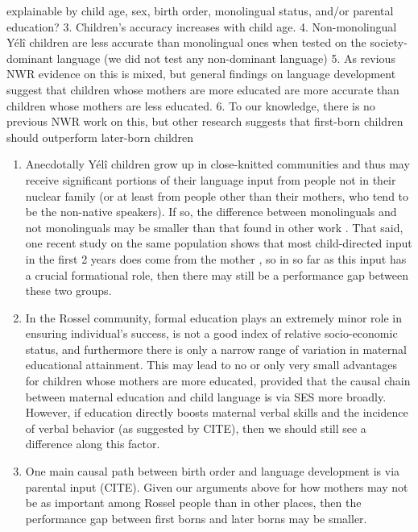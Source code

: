 \documentclass[english,,man,floatsintext]{apa6}
\providecommand{\tightlist}{%
  \setlength{\itemsep}{0pt}\setlength{\parskip}{0pt}}
\begin{document}
explainable by child age, sex, birth order, monolingual status, and/or parental education?
3. Children's accuracy increases with child age.
4. Non-monolingual Yélî children are less accurate than monolingual ones when tested on the society-dominant language (we did not test any non-dominant language)
5. As revious NWR evidence on this is mixed, but general findings on language development suggest that children whose mothers are more educated are more accurate than children whose mothers are less educated.
6. To our knowledge, there is no previous NWR work on this, but other research suggests that first-born children should outperform later-born children

\begin{enumerate}
\def\labelenumi{\arabic{enumi}.}
\setcounter{enumi}{3}
\tightlist
\item
  Anecdotally Yélî children grow up in close-knitted communities and thus may receive significant portions of their language input from people not in their nuclear family
  (or at least from people other than their mothers, who tend to be the non-native speakers). If so, the difference between monolinguals and not monolinguals may be smaller than that found in other work
  . That said, one recent study on the same population shows that most child-directed input in the first 2 years does come from the mother
  , so in so far as this input has a crucial formational role, then there may still be a performance gap between these two groups.
\item
  In the Rossel community, formal education plays an extremely minor role in ensuring individual's success, is not a good index of relative socio-economic status, and furthermore there is only a narrow range of variation in maternal educational attainment. This may lead to no or only very small advantages for children whose mothers are more educated, provided that the causal chain between maternal education and child language is via SES more broadly. However, if education directly boosts maternal verbal skills and the incidence of verbal behavior (as suggested by CITE), then we should still see a difference along this factor.
\item
  One main causal path between birth order and language development is via parental input (CITE). Given our arguments above for how mothers may not be as important among Rossel people than in other places, then the performance gap between first borns and later borns may be smaller.
\end{enumerate}
\end{document}
